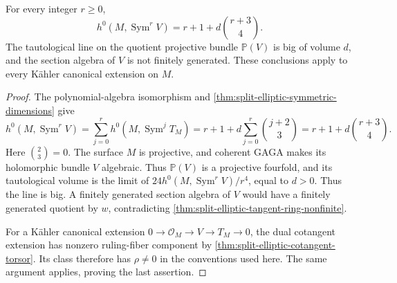 \begin{corollary}\label{cor:elliptic-extension-symmetric-dimensions}
For every integer $r\geq0$,
\[
 h^0(M,\operatorname{Sym}^rV)
       =r+1+d\binom{r+3}{4}.
\]
The tautological line on the quotient projective bundle $\mathbb P(V)$ is big of volume $d$, and the section algebra of $V$ is not finitely generated. These conclusions apply to every K\"ahler canonical extension on $M$.
\end{corollary}
\begin{proof}
The polynomial-algebra isomorphism and \cref{thm:split-elliptic-symmetric-dimensions} give
\[
 h^0(M,\operatorname{Sym}^rV)
 =\sum_{j=0}^r h^0(M,\operatorname{Sym}^jT_M)
 =r+1+d\sum_{j=0}^r\binom{j+2}{3}
 =r+1+d\binom{r+3}{4}.
\]
Here $\binom{2}{3}=0$. The surface $M$ is projective, and coherent GAGA makes its holomorphic bundle $V$ algebraic. Thus $\mathbb P(V)$ is a projective fourfold, and its tautological volume is the limit of $24h^0(M,\operatorname{Sym}^rV)/r^4$, equal to $d>0$. Thus the line is big. A finitely generated section algebra of $V$ would have a finitely generated quotient by $w$, contradicting \cref{thm:split-elliptic-tangent-ring-nonfinite}.

For a K\"ahler canonical extension $0\to\mathcal O_M\to V\to T_M\to0$, the dual cotangent extension has nonzero ruling-fiber component by \cref{thm:split-elliptic-cotangent-torsor}. Its class therefore has $\rho\ne0$ in the conventions used here. The same argument applies, proving the last assertion.
\end{proof}
